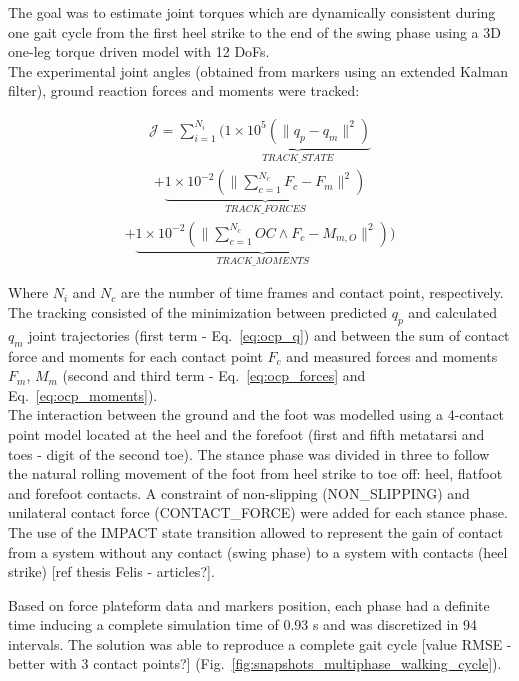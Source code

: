 The goal was to estimate joint torques which are dynamically consistent during one gait cycle from the first heel strike to the end of the swing phase using a 3D one-leg torque driven model with 12 DoFs.  \\

The experimental joint angles (obtained from markers using an extended Kalman filter), ground reaction forces and moments were tracked:

\begin{eqnarray}
\label{eq:ocp_q}
\mathcal{J} = \sum_{i=1}^{N_i}\Bigg(\underbrace{1\times 10^{5}(\|q_p - q_m\|^{2})}_{TRACK\_STATE}
\label{eq:ocp_forces}
\end{eqnarray}
\begin{eqnarray}
+ \underbrace{1\times 10^{-2}(\|\sum_{c=1}^{N_c}F_c - F_m\|^{2})}_{TRACK\_FORCES}
\end{eqnarray}
\begin{eqnarray}
\label{eq:ocp_moments}
+ \underbrace{1\times 10^{-2}(\|\sum_{c=1}^{N_c}OC\wedge F_c - M_{m,O}\|^{2})}_{TRACK\_MOMENTS}\bigg) 
\end{eqnarray}

Where $N_i$ and $N_c$ are the number of time frames and contact point, respectively. The tracking consisted of the minimization between predicted $q_p$ and calculated $q_m$ joint trajectories (first term - Eq.~\ref{eq:ocp_q}) and between the sum of contact force and moments for each contact point $F_c$ and measured forces and moments $F_m$, $M_m$ (second and third term - Eq.~\ref{eq:ocp_forces} and Eq.~\ref{eq:ocp_moments}). \\


The interaction between the ground and the foot was modelled using a 4-contact point model located at the heel and the forefoot (first and fifth metatarsi and toes - digit of the second toe). The stance phase was divided in three to follow the natural rolling movement of the foot from heel strike to toe off: heel, flatfoot and forefoot contacts. A constraint of non-slipping (NON\_SLIPPING) and unilateral contact force (CONTACT\_FORCE) were added for each stance phase. The use of the IMPACT state transition allowed to represent the gain of contact from a system without any contact (swing phase) to a system with contacts (heel strike) [ref thesis Felis - articles?].  


Based on force plateform data and markers position, each phase had a definite time inducing a complete simulation time of 0.93 s and was discretized in 94 intervals. The solution was able to reproduce a complete gait cycle [value RMSE - better with 3 contact points?] (Fig.~\ref{fig:snapshots_multiphase_walking_cycle}). 

